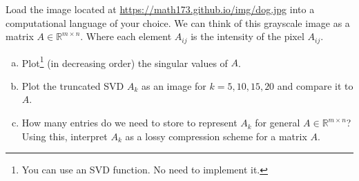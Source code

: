 \documentclass[12pt,letterpaper,cm]{hmcpset}
\begin{document}
\begin{solution}
    \vfill
\end{solution}

\begin{problem}[4]
    Load the image located at \url{https://math173.github.io/img/dog.jpg} into a computational language of your choice.
    We can think of this grayscale image as a matrix $A\in\mathbb{R}^{m\times n}$. Where each element $A_{ij}$ is
    the intensity of the pixel $A_{ij}$.
\begin{enumerate}[(a)]
    \item Plot\footnote{You can use an SVD function. No need to implement it.} (in decreasing order) the singular values of $A$.
    \item Plot the truncated SVD $A_k$ as an image for $k=5,10,15,20$ and compare it to $A$.
    \item How many entries do we need to store to represent $A_k$ for general $A\in\mathbb{R}^{m\times n}$?
        Using this, interpret $A_k$ as a lossy compression scheme for a matrix $A$.
\end{enumerate}
\end{problem}

\begin{solution}
    \vfill
\end{solution}
\clearpage
\end{document}

